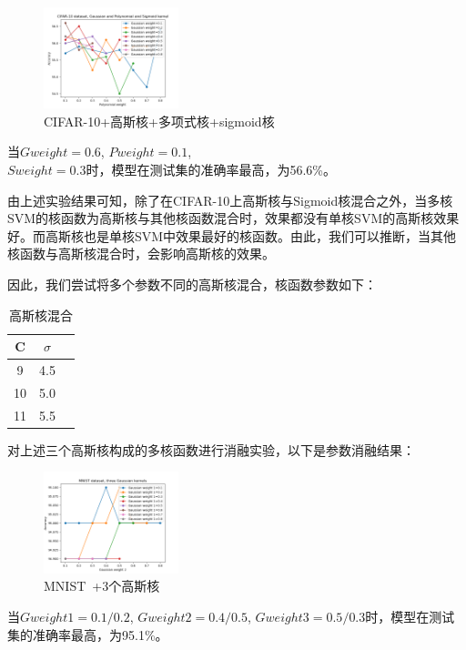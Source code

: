 \documentclass[a4paper]{article}
\begin{document}
\begin{figure}[H]
    \centering
    \includegraphics[width=0.35\textwidth]{pictures/multi kernel/CIFAR10+高斯核+多项式核+sigmoid核.png}
    \caption{\fontsize{10}{17}\selectfont CIFAR-10+高斯核+多项式核+sigmoid核}
\end{figure}
当$Gweight=0.6$, $Pweight=0.1$, \\$Sweight=0.3$时，模型在测试集的准确率最高，为56.6\%。

由上述实验结果可知，除了在CIFAR-10上高斯核与Sigmoid核混合之外，当多核SVM的核函数为高斯核与其他核函数混合时，效果都没有单核SVM的高斯核效果好。而高斯核也是单核SVM中效果最好的核函数。由此，我们可以推断，当其他核函数与高斯核混合时，会影响高斯核的效果。

因此，我们尝试将多个参数不同的高斯核混合，核函数参数如下：
\begin{table}[H]
  \caption{高斯核混合}
  \centering
  \begin{tabular}{ c c c }
    \toprule
    \textbf{C} & \textbf{$\sigma$} \\
    \midrule
    9 & 4.5 \\
    10 & 5.0 \\
    11 & 5.5 \\
    \bottomrule
  \end{tabular}
\end{table}

对上述三个高斯核构成的多核函数进行消融实验，以下是参数消融结果：
\begin{figure}[H]
    \centering
    \includegraphics[width=0.35\textwidth]{pictures/multi kernel/MNIST+3高斯核.png}
    \caption{MNIST\ +3个高斯核}
\end{figure}
当$Gweight1=0.1/0.2$, $Gweight2=0.4/0.5$, $Gweight3=0.5/0.3$时，模型在测试集的准确率最高，为95.1\%。
\end{document}
